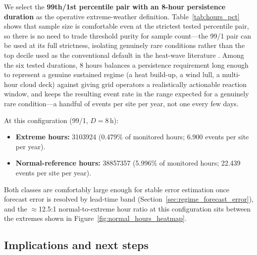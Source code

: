 We select the \textbf{99th/1st percentile pair with an 8-hour persistence duration} as the
operative extreme-weather definition. Table~\ref{tab:hours_pct} shows that sample size is
comfortable even at the strictest tested percentile pair, so there is no need to trade threshold
purity for sample count---the 99/1 pair can be used at its full strictness, isolating genuinely
rare conditions rather than the top decile used as the conventional default in the heat-wave
literature \citep{perkinsalexander2013}. Among the six tested durations, 8 hours balances a
persistence requirement long enough to represent a genuine sustained regime (a heat build-up, a
wind lull, a multi-hour cloud deck) against giving grid operators a realistically actionable
reaction window, and keeps the resulting event rate in the range expected for a genuinely rare
condition---a handful of events per site per year, not one every few days.

At this configuration (99/1, $D=8$\,h):
\begin{itemize}
  \item \textbf{Extreme hours:} \num{3103924} (\num{0.479}\% of monitored hours;
        \num{6.900} events per site per year).
  \item \textbf{Normal-reference hours:} \num{38857357} (\num{5.996}\% of monitored hours;
        \num{22.439} events per site per year).
\end{itemize}
Both classes are comfortably large enough for stable error estimation once forecast error is
resolved by lead-time band (Section~\ref{sec:regime_forecast_error}), and the
$\approx$12.5:1 normal-to-extreme hour ratio at this configuration sits between the extremes shown
in Figure~\ref{fig:normal_hours_heatmap}.

\subsection{Implications and next steps}

